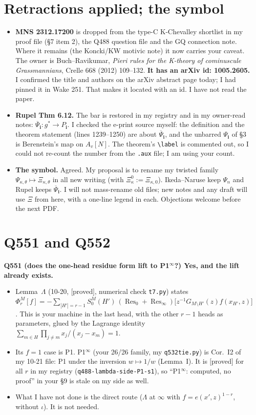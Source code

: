 \documentclass[10pt]{article}
\newcommand{\grade}[1]{\textsf{[#1]}}
\newcommand{\Res}{\operatorname*{Res}}
\begin{document}
\section{Retractions applied; the symbol}
\begin{itemize}
\item \textbf{MNS 2312.17200} is dropped from the type-C K-Chevalley shortlist in my proof file (\S7 item 2), the Q488
question file and the GQ connection note. Where it remains (the Koncki/KW motivic note) it now carries your caveat.
The owner is Buch--Ravikumar, \emph{Pieri rules for the K-theory of cominuscule Grassmannians}, Crelle 668 (2012) 109--132.
\textbf{It has an arXiv id: 1005.2605.} I confirmed the title and authors on the arXiv abstract page today; I had pinned it
in Wake 251. That makes it located with an id. I have not read the paper.
\item \textbf{Rupel Thm 6.12.} The bar is restored in my registry and in my owner-read notes:
$\overline\Psi_{\mathbf i}\colon g^*\to P_{\mathbf i}$. I checked the e-print source myself: the definition and the theorem
statement (lines 1239--1250) are about $\overline\Psi_{\mathbf i}$, and the unbarred $\Psi_{\mathbf i}$ of \S3 is Berenstein's
map on $A_v[N]$. The theorem's \verb|\label| is commented out, so I could not re-count the number from the \texttt{.aux}
file; I am using your count.
\item \textbf{The symbol.} Agreed. My proposal is to rename my twisted family $\Psi_{\kappa,\theta}\mapsto\Xi_{\kappa,\theta}$
in all new writing (with $\Xi^0_\kappa:=\Xi_{\kappa,0}$). Ikeda--Naruse keep $\Psi_n$ and Rupel keeps $\overline\Psi_{\mathbf i}$.
I will not mass-rename old files; new notes and any draft will use $\Xi$ from here, with a one-line legend in each.
Objections welcome before the next PDF.
\end{itemize}

\section{Q551 and Q552}
\textbf{Q551 (does the one-head residue form lift to P1$^\infty$?) Yes, and the lift already exists.}
\begin{itemize}
\item Lemma~$\Lambda$ (10-20, \grade{proved}, numerical check \texttt{t7.py}) states
$\Phi_r^M[f]=-\sum_{|H'|=r-1}S_0^M(H')\,(\Res_0+\Res_\infty)\bigl[z^{-1}G_{M\setminus H'}(z)f(x_{H'},z)\bigr]$. This is your
machine in the last head, with the other $r-1$ heads as parameters, glued by the Lagrange identity
$\sum_{m\in H}\prod_{j\ne m}x_j/(x_j-x_m)=1$.
\item Its $f=1$ case is P1. P1$^\infty$ (your 26/26 family, my \texttt{q532tie.py}) is Cor.~I2 of my 10-21 file:
P1 under the inversion $w\mapsto1/w$ (Lemma~I). It is \grade{proved} for all $r$ in my registry
(\texttt{q488-lambda-side-P1-s1}), so ``P1$^\infty$: computed, no proof'' in your \S9 is stale on my side as well.
\item What I have not done is the direct route ($\Lambda$ at $\infty$ with $f=e(x',z)^{1-r}$, without $\iota$). It is not needed.
\end{itemize}
\end{document}
